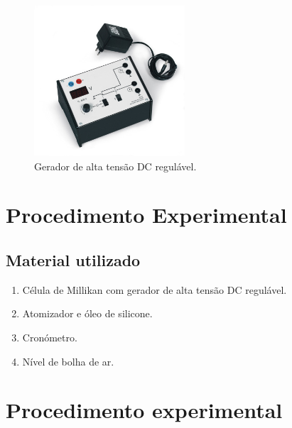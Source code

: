 \documentclass[a4paper,twoside,12pt]{article}      %
\begin{document}
\begin{figure}
	[htb]  \centering 
	\includegraphics[width=0.5\textwidth]{./U13105-230_01_Aparelho-operacional-de-Millikan}
	\caption{Gerador de alta tensão DC regulável. \label{fig:fonteDC_HT}} 
\end{figure}


\newpage
\section{\sf Procedimento Experimental}


\subsection{\sf Material utilizado}

\begin{enumerate}
	\item Célula de Millikan com gerador de alta tensão DC regulável. 
	\item  Atomizador e óleo de silicone.
	\item Cronómetro. 
	\item Nível de bolha de ar.%
\end{enumerate}
\section{\sf Procedimento experimental}
\end{document}

